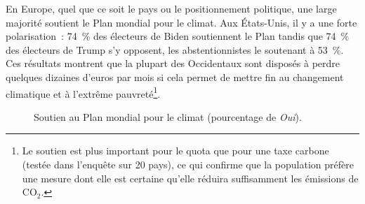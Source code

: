 \documentclass[a5paper,french,openany]{memoir}
\begin{document}
En Europe, quel que ce soit le pays ou le positionnement politique, une large majorité soutient le Plan mondial pour le climat. 
Aux États-Unis, il y a une forte polarisation~: 74~\% des électeurs de Biden soutiennent le Plan tandis que 74~\% des électeurs de Trump s'y opposent, les abstentionnistes le soutenant à 53~\%.  
Ces résultats montrent que la plupart des Occidentaux sont disposés à perdre quelques dizaines d'euros par mois si cela permet de mettre fin au changement climatique et à l'extrême pauvreté\footnote{Le soutien est plus important pour le quota que pour une taxe carbone (testée dans l'enquête sur 20 pays), ce qui confirme que la population préfère une mesure dont elle est certaine qu'elle réduira suffisamment les émissions de CO$_\text{2}$.}. 

\begin{figure}[h!]
  \caption[Soutien au Plan mondial pour le climat]{Soutien au Plan mondial pour le climat (pourcentage de \textit{Oui}).} 
  \label{fig:gcs_support} 
\end{figure}
\end{document}
